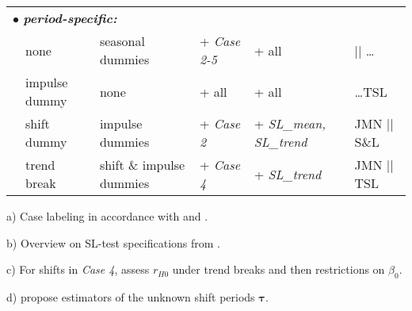 \begin{threeparttable}
\begin{tabular}{lll|l||ll}
		\multicolumn{3}{l|}{$ \bullet $ \textit{\textbf{period-specific:}}} & & & \\
		& none & seasonal dummies & + \textit{Case 2-5}      & + all & \citet[p.~84]{Johansen1996} ||  \ldots \\
		& impulse dummy & none & + all & + all & \quad \ldots TSL \citeyearpar[p.~348]{TrenklerEtAl2008} \\
		& shift dummy    & impulse dummies	& + \textit{Case 2} \tnote{c)} & + \textit{SL\_mean, SL\_trend} & JMN \citeyearpar[Ch.~3.2]{JohansenEtAl2000} || S\&L \citeyearpar{SaikkonenLutkepohl2000b}\tnote{d)} \\
		& trend break    & shift \& impulse dummies	   & + \textit{Case 4} & + \textit{SL\_trend} & JMN \citeyearpar[Ch.~3.1]{JohansenEtAl2000} || TSL \citeyearpar{TrenklerEtAl2008} \\ \hline\hline
	\end{tabular}
	\begin{tablenotes}
		\item[a)] Case labeling in accordance with \citet[Ch.~6.3]{Juselius2007} and \citet[p.~193]{HlouskovaWagner2010}.
		\item[b)] Overview on SL-test specifications from \citet[p. 24, Tab. 1; p. 25, Tab. 2]{Trenkler2008}.
		\item[c)] For shifts in \textit{Case 4}, \citet[JMN,][Ch.~4]{JohansenEtAl2000} assess $ r_{H0} $ under trend breaks and then restrictions on $ \beta_{0} $. 
		\item[d)] \citet[TSL,][]{LutkepohlEtAl2004} propose estimators of the unknown shift periods $ \boldsymbol{\tau} $.
	\end{tablenotes}
\end{threeparttable}


